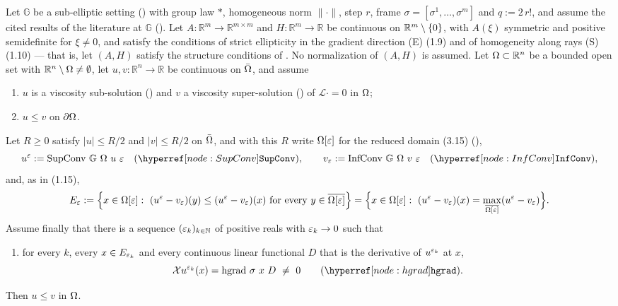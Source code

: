 \begin{theorem}[Theorem~1.2]
Let $\mathbb G$ be a sub-elliptic setting () with group law $*$,
homogeneous norm $\|\cdot\|$, step $r$, frame $\sigma=[\sigma^1,\ldots,\sigma^m]$ and
$q:=2\,r!$, and assume the cited results of the literature at $\mathbb G$
(). Let
$A:\mathbb R^{m}\to\mathbb R^{m\times m}$ and $H:\mathbb R^{m}\to\mathbb R$ be continuous on
$\mathbb R^{m}\setminus\{0\}$, with $A(\xi)$ symmetric and positive semidefinite for
$\xi\ne0$, and satisfy the conditions of strict ellipticity in the gradient direction (E)
(1.9) and of homogeneity along rays (S) (1.10) --- that is, let $(A,H)$ satisfy the
structure conditions of . No normalization of $(A,H)$ is
assumed. Let
$\Omega\subset\mathbb R^{n}$ be a bounded open set with $\mathbb R^{n}\setminus\Omega\ne\emptyset$, let
$u,v:\mathbb R^{n}\to\mathbb R$ be continuous on $\bar{\Omega}$, and assume
\begin{enumerate}
\item $u$ is a viscosity sub-solution () and $v$ a viscosity
  super-solution () of $\mathcal L\cdot=0$ in $\Omega$;
\item $u\le v$ on $\partial\Omega$.
\end{enumerate}
Let $R\ge0$ satisfy $|u|\le R/2$ and $|v|\le R/2$ on $\bar{\Omega}$, and with this $R$ write
$\Omega[\varepsilon]$ for the reduced domain (3.15) (),
\[
 u^{\eps}:=\mathrm{SupConv}\ \mathbb G\ \Om\ u\ \eps\quad(\noderef{SupConv}),\qquad
 v_{\eps}:=\mathrm{InfConv}\ \mathbb G\ \Om\ v\ \eps\quad(\noderef{InfConv}),
\]
and, as in (1.15),
\[
 E_\eps:=\Big\{x\in\Om[\eps]:\ (u^{\eps}-v_{\eps})(y)\le(u^{\eps}-v_{\eps})(x)
 \ \text{for every}\ y\in\overline{\Om[\eps]}\Big\}
 =\Big\{x\in\Om[\eps]:\ (u^{\eps}-v_{\eps})(x)=\max_{\overline{\Om[\eps]}}(u^{\eps}-v_{\eps})\Big\} .
\]
Assume finally that there is a sequence $(\varepsilon_k)_{k\in\mathbb N}$ of positive reals with
$\varepsilon_k\to0$ such that
\begin{enumerate}
\item[(3)] for every $k$, every $x\in E_{\varepsilon_k}$ and every continuous linear functional $D$
  that is the derivative of $u^{\varepsilon_k}$ at $x$,
  \[
   \mathcal Xu^{\eps_k}(x)=\mathrm{hgrad}\ \sigma\ x\ D\ \ne\ 0
   \qquad(\noderef{hgrad}).
  \]
\end{enumerate}
Then $u\le v$ in $\Omega$.
\end{theorem}
